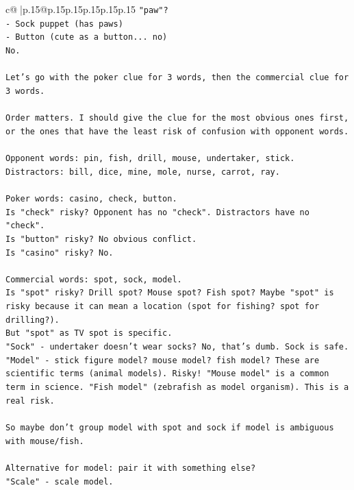 \documentclass{article}
\begin{document}
{\begin{supertabular}{c@{$\;$}|p{.15\linewidth}@{}p{.15\linewidth}p{.15\linewidth}p{.15\linewidth}p{.15\linewidth}p{.15\linewidth}}
{{{\texttt{"paw"?} \\
\texttt{{-} Sock puppet (has paws)} \\
\texttt{{-} Button (cute as a button... no)} \\
\texttt{No.} \\
\\ 
\texttt{Let's go with the poker clue for 3 words, then the commercial clue for 3 words.} \\
\\ 
\texttt{Order matters. I should give the clue for the most obvious ones first, or the ones that have the least risk of confusion with opponent words.} \\
\\ 
\texttt{Opponent words: pin, fish, drill, mouse, undertaker, stick.} \\
\texttt{Distractors: bill, dice, mine, mole, nurse, carrot, ray.} \\
\\ 
\texttt{Poker words: casino, check, button.} \\
\texttt{Is "check" risky? Opponent has no "check". Distractors have no "check".} \\
\texttt{Is "button" risky? No obvious conflict.} \\
\texttt{Is "casino" risky? No.} \\
\\ 
\texttt{Commercial words: spot, sock, model.} \\
\texttt{Is "spot" risky? Drill spot? Mouse spot? Fish spot? Maybe "spot" is risky because it can mean a location (spot for fishing? spot for drilling?).} \\
\texttt{But "spot" as TV spot is specific.} \\
\texttt{"Sock" {-} undertaker doesn't wear socks? No, that's dumb. Sock is safe.} \\
\texttt{"Model" {-} stick figure model? mouse model? fish model? These are scientific terms (animal models). Risky! "Mouse model" is a common term in science. "Fish model" (zebrafish as model organism). This is a real risk.} \\
\\ 
\texttt{So maybe don't group model with spot and sock if model is ambiguous with mouse/fish.} \\
\\ 
\texttt{Alternative for model: pair it with something else?} \\
\texttt{"Scale" {-} scale model.} \\
}}}
\end{supertabular}}
\end{document}
